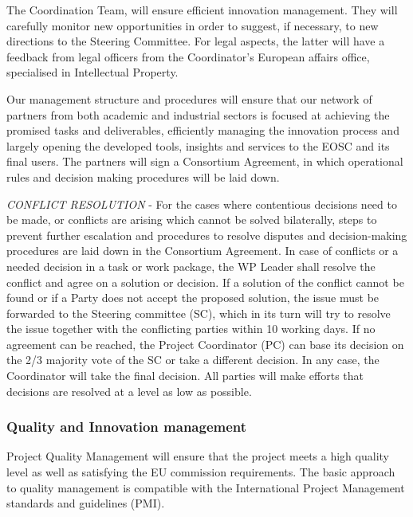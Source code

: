 The Coordination Team, will ensure efficient innovation management.
They will carefully monitor new opportunities in order to suggest, if
necessary, to new directions to the Steering Committee. For legal
aspects, the latter will have a feedback from legal officers from the
Coordinator’s European affairs office,
specialised in Intellectual Property.

Our management structure and procedures will ensure that our network
of partners from both academic and industrial sectors is focused at
achieving the promised tasks and deliverables, efficiently managing
the innovation process and largely opening the developed tools,
insights and services to the EOSC and its final users.
The partners will sign a Consortium Agreement, in which operational
rules and decision making procedures will be laid down.

\emph{CONFLICT RESOLUTION} - For the cases where contentious decisions
need to be made, or conflicts are arising which cannot be solved bilaterally,
steps to prevent further escalation and procedures to resolve disputes
and decision-making procedures are laid down in the Consortium Agreement.
In case of conflicts or a needed decision in a task or work package,
the WP Leader shall resolve the conflict and agree on a solution or decision.
If a solution of the conflict cannot be found or if a Party does not accept
the proposed solution, the issue must be forwarded to the Steering committee (SC),
which in its turn will try to resolve the issue together with the conflicting parties
within 10 working days. If no agreement can be reached, the Project Coordinator (PC) can
base its decision on the 2/3 majority vote of the SC or take a different decision.
In any case, the Coordinator will take the final decision. All parties will make
efforts that decisions are resolved at a level as low as possible.

\subsubsection{Quality and Innovation management}

\TheProject Project Quality Management will ensure that
the project meets a high quality level as well as satisfying the EU commission
requirements. The basic approach to quality management is compatible with the
International Project Management standards and guidelines (PMI).

